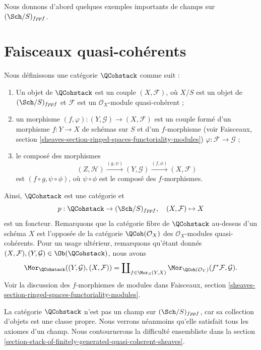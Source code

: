 \noindent
Nous donnons d'abord quelques exemples importants de champs sur
$(\Sch/S)_{fppf}$.




\section{Faisceaux quasi-cohérents}
\label{section-stack-of-quasi-coherent-sheaves}

\noindent
Nous définissons une catégorie $\QCohstack$ comme suit :
\begin{enumerate}
\item Un objet de $\QCohstack$ est un couple $(X, \mathcal{F})$,
où $X/S$ est un objet de $(\Sch/S)_{fppf}$ et $\mathcal{F}$
est un $\mathcal{O}_X$-module quasi-cohérent ;
\item un morphisme $(f, \varphi) : (Y, \mathcal{G}) \to (X, \mathcal{F})$
est un couple formé d'un morphisme $f : Y \to X$ de schémas sur $S$
et d'un $f$-morphisme (voir
Faisceaux, section \ref{sheaves-section-ringed-spaces-functoriality-modules})
$\varphi : \mathcal{F} \to \mathcal{G}$ ;
\item le composé des morphismes
$$
(Z, \mathcal{H}) \xrightarrow{(g, \psi)}
(Y, \mathcal{G}) \xrightarrow{(f, \phi)} (X, \mathcal{F})
$$
est $(f \circ g, \psi \circ \phi)$, où $\psi \circ \phi$ est
le composé des $f$-morphismes.
\end{enumerate}
Ainsi, $\QCohstack$ est une catégorie et
$$
p : \QCohstack \to (\Sch/S)_{fppf},
\quad
(X, \mathcal{F}) \mapsto X
$$
est un foncteur. Remarquons que la catégorie fibre de $\QCohstack$ au-dessus
d'un schéma $X$ est l'opposée de la catégorie $\QCoh(\mathcal{O}_X)$
des $\mathcal{O}_X$-modules quasi-cohérents.
Pour un usage ultérieur, remarquons qu'étant donnés
$(X, \mathcal{F}), (Y, \mathcal{G}) \in \Ob(\QCohstack)$,
nous avons
\begin{equation}
\label{equation-morphisms-qcoh}
\Mor_{\QCohstack}((Y, \mathcal{G}), (X, \mathcal{F}))
=
\coprod\nolimits_{f \in \Mor_S(Y, X)}
\Mor_{\QCoh(\mathcal{O}_Y)}(f^*\mathcal{F}, \mathcal{G}).
\end{equation}
Voir la discussion des $f$-morphismes de modules dans
Faisceaux, section \ref{sheaves-section-ringed-spaces-functoriality-modules}.

\medskip\noindent
La catégorie $\QCohstack$ n'est pas un champ sur $(\Sch/S)_{fppf}$,
car sa collection d'objets est une classe propre. Nous verrons néanmoins
qu'elle satisfait tous les axiomes d'un champ. Nous contournerons
la difficulté ensembliste dans la
section \ref{section-stack-of-finitely-generated-quasi-coherent-sheaves}.

